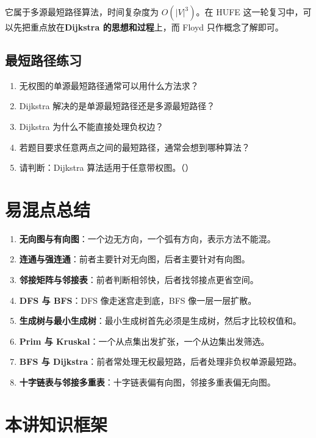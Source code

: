 \documentclass{../../note}
\begin{document}
它属于多源最短路径算法，时间复杂度为 $O(|V|^3)$。在 HUFE 这一轮复习中，可以先把重点放在\textbf{Dijkstra 的思想和过程}上，而 Floyd 只作概念了解即可。

\subsection{最短路径练习}

\begin{enumerate}
  \item 无权图的单源最短路径通常可以用什么方法求？
  \item Dijkstra 解决的是单源最短路径还是多源最短路径？
  \item Dijkstra 为什么不能直接处理负权边？
  \item 若题目要求任意两点之间的最短路径，通常会想到哪种算法？
  \item 请判断：Dijkstra 算法适用于任意带权图。（\hspace{1cm}）
\end{enumerate}

\section{易混点总结}

\begin{enumerate}
  \item \textbf{无向图与有向图}：一个边无方向，一个弧有方向，表示方法不能混。
  \item \textbf{连通与强连通}：前者主要针对无向图，后者主要针对有向图。
  \item \textbf{邻接矩阵与邻接表}：前者判断相邻快，后者找邻接点更省空间。
  \item \textbf{DFS 与 BFS}：DFS 像走迷宫走到底，BFS 像一层一层扩散。
  \item \textbf{生成树与最小生成树}：最小生成树首先必须是生成树，然后才比较权值和。
  \item \textbf{Prim 与 Kruskal}：一个从点集出发扩张，一个从边集出发筛选。
  \item \textbf{BFS 与 Dijkstra}：前者常处理无权最短路，后者处理非负权单源最短路。
  \item \textbf{十字链表与邻接多重表}：十字链表偏有向图，邻接多重表偏无向图。
\end{enumerate}

\section{本讲知识框架}
\end{document}
